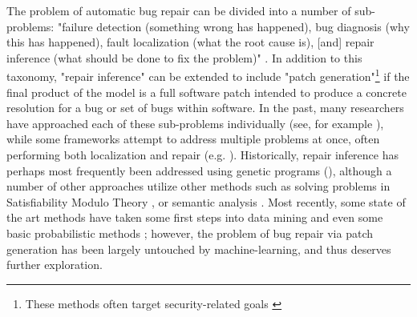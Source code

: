 \documentclass{article}
\begin{document}
The problem of automatic bug repair can be divided into a number of sub-problems: "failure detection (something wrong has happened), bug diagnosis (why this has happened), fault localization (what the root cause is), [and] repair inference (what should be done to fix the problem)" \cite{monperrus2014critical}. In addition to this taxonomy, "repair inference" can be extended to include "patch generation"\footnote{These methods often target security-related goals \cite{cui2007shieldgen,sidiroglou2005countering}} if the final product of the model is a full software patch intended to produce a concrete resolution for a bug or set of bugs within software. In the past, many researchers have approached each of these sub-problems individually (see, for example \cite{monperrus2015automatic,dallmeier2007extraction,kim2006automatic,liu2005sober,lukins2010bug}), while some frameworks attempt to address multiple problems at once, often performing both localization and repair (e.g. \cite{long2016automatic}). Historically, repair inference has perhaps most frequently been addressed using genetic programs (\cite{forrest2009genetic,arcuri2008novel,le2012genprog,le2013automatic,weimer2010automatic,kim2013automatic}), although a number of other approaches utilize other methods such as solving problems in Satisfiability Modulo Theory  \cite{demarco2014automatic,xuan2017nopol}, or semantic analysis \cite{nguyen2013semfix}. Most recently, some state of the art methods have taken some first steps into data mining \cite{le2016history} and even some basic probabilistic methods \cite{long2016automatic}; however, the problem of bug repair via patch generation has been largely untouched by machine-learning, and thus deserves further exploration.
\end{document}
